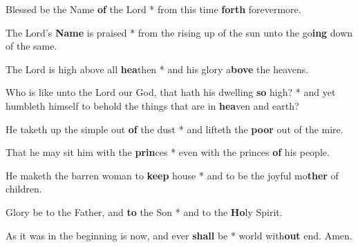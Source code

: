 \begin{multicols}{2}
	Blessed be the Name \textbf{of} the Lord * from this time \textbf{forth} forevermore.
	
	The Lord's \textbf{Name} is praised * from the rising up of the sun unto the go\textbf{ing} down of the same.
	
	The Lord is high above all \textbf{hea}then * and his glory a\textbf{bove} the heavens.
	
	Who is like unto the Lord our God, that hath his dwelling \textbf{so} high? * and yet humbleth himself to behold the things that are in \textbf{hea}ven and earth?
	
	He taketh up the simple out \textbf{of} the dust * and lifteth the \textbf{poor} out of the mire.
	
	That he may sit him with the \textbf{prin}ces * even with the princes \textbf{of} his people.
	
	He maketh the barren woman to \textbf{keep} house * and to be the joyful mo\textbf{ther} of children.
	
	Glory be to the Father, and \textbf{to} the Son * and to the \textbf{Ho}ly Spirit.
	
	As it was in the beginning is now, and ever \textbf{shall} be * world with\textbf{out} end. Amen.
\end{multicols}